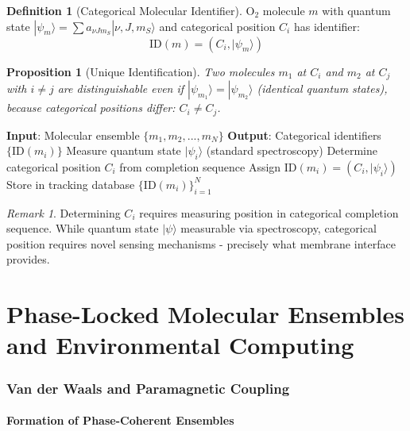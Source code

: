 \documentclass[11pt,a4paper]{article}
\newtheorem{proposition}[theorem]{Proposition}
\theoremstyle{definition}
\newtheorem{definition}[theorem]{Definition}
\theoremstyle{remark}
\newtheorem{remark}[theorem]{Remark}
\begin{document}
\begin{definition}[Categorical Molecular Identifier]
O$_2$ molecule $m$ with quantum state $|\psi_m\rangle = \sum a_{\nu Jm_S} |\nu, J, m_S\rangle$ and categorical position $C_i$ has identifier:
\begin{equation}
\text{ID}(m) = (C_i, |\psi_m\rangle)
\end{equation}
\end{definition}

\begin{proposition}[Unique Identification]
Two molecules $m_1$ at $C_i$ and $m_2$ at $C_j$ with $i \neq j$ are distinguishable even if $|\psi_{m_1}\rangle = |\psi_{m_2}\rangle$ (identical quantum states), because categorical positions differ: $C_i \neq C_j$.
\end{proposition}

\begin{algorithm}[H]
\caption{Categorical Molecular Tracking}
\begin{algorithmic}[1]
\STATE \textbf{Input}: Molecular ensemble $\{m_1, m_2, ..., m_N\}$
\STATE \textbf{Output}: Categorical identifiers $\{\text{ID}(m_i)\}$
    \STATE Measure quantum state $|\psi_i\rangle$ (standard spectroscopy)
    \STATE Determine categorical position $C_i$ from completion sequence
    \STATE Assign $\text{ID}(m_i) = (C_i, |\psi_i\rangle)$
    \STATE Store in tracking database
\ENDFOR
\RETURN $\{\text{ID}(m_i)\}_{i=1}^N$
\end{algorithmic}
\end{algorithm}

\begin{remark}
Determining $C_i$ requires measuring position in categorical completion sequence. While quantum state $|\psi\rangle$ measurable via spectroscopy, categorical position requires novel sensing mechanisms - precisely what membrane interface provides.
\end{remark}

\part{Phase-Locked Molecular Ensembles and Environmental Computing}

\section{Van der Waals and Paramagnetic Coupling}

\subsection{Formation of Phase-Coherent Ensembles}
\end{document}
